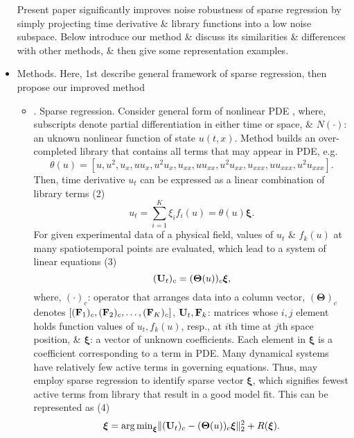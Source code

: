 \documentclass{article}
\begin{document}
\begin{itemize}
	Present paper significantly improves noise robustness of sparse regression by simply projecting time derivative \& library functions into a low noise subspace. Below introduce our method \& discuss its similarities \& differences with other methods, \& then give some representation examples.
	\item {\sf Methods.} Here, 1st describe general framework of sparse regression, then propose our improved method
	\begin{itemize}
		\item {. Sparse regression.} Consider general form of nonlinear PDE , where, subscripts denote partial differentiation in either time or space, \& $N(\cdot)$: an uknown nonlinear function of state $u(t,x)$. Method builds an over-completed library that contains all terms that may appear in PDE, e.g.
		\begin{equation}
			\theta(u) = [u,u^2,u_x,uu_x,u^2u_x,u_{xx},uu_{xx},u^2u_{xx},u_{xxx},uu_{xxx},u^2u_{xxx}].
		\end{equation}
		Then, time derivative $u_t$ can be expressed as a linear combination of library terms (2)
		\begin{equation}
			u_t = \sum_{i=1}^K \xi_if_i(u) = \theta(u)\boldsymbol{\xi}.
		\end{equation}
		For given experimental data of a physical field, values of $u_t$ \& $f_k(u)$ at many spatiotemporal points are evaluated, which lead to a system of linear equations (3)
		\begin{equation}
			({\bf U}_t)_c = (\boldsymbol{\Theta}(u))_c\boldsymbol{\xi},
		\end{equation}
		where, $(\cdot)_c$: operator that arranges data into a column vector, $(\boldsymbol{\Theta})_c$ denotes $[({\bf F}_1)_c,({\bf F}_2)_c,\ldots,({\bf F}_K)_c]$, ${\bf U}_t,{\bf F}_k$: matrices whose $i,j$ element holds function values of $u_t,f_k(u)$, resp., at $i$th time at $j$th space position, \& $\boldsymbol{\xi}$: a vector of unknown coefficients. Each element in $\boldsymbol{\xi}$ is a coefficient corresponding to a term in PDE. Many dynamical systems have relatively few active terms in governing equations. Thus, may employ sparse regression to identify sparse vector $\boldsymbol{\xi}$, which signifies fewest active terms from library that result in a good model fit. This can be represented as (4)
		\begin{equation}
			\boldsymbol{\xi} = {\arg\min}_{\boldsymbol{\xi}} \|({\bf U}_t)_c - (\boldsymbol{\Theta}(u))_c\boldsymbol{\xi}\|_2^2 + R(\boldsymbol{\xi}).

\end{equation}
\end{itemize}
\end{itemize}
\end{document}
